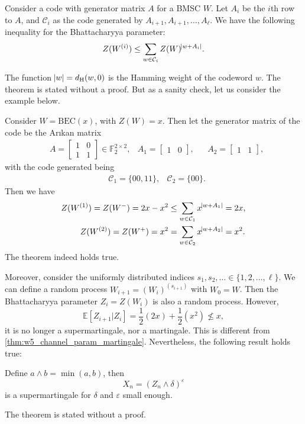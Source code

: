 \begin{theorem}
    Consider a code with generator matrix $A$ for a BMSC $W$. Let $A_i$ be the $i$th row to $A$, and $\mathcal{C}_i$ as the code generated by $A_{i+1},A_{i+1},\ldots,A_\ell$. We have the following inequality for the Bhattacharyya parameter:
    \begin{equation}
        Z(W^{(i)}) \le \sum_{w\in\mathcal{C}_i} Z(W)^{\abs{w+A_i}}.
    \end{equation}
\end{theorem}
The function $\abs{w}=d_\mathrm{H}(w,0)$ is the Hamming weight of the codeword $w$. The theorem is stated without a proof. But as a sanity check, let us consider the example below.
\begin{example}
    Consider $W=\mathrm{BEC}(x)$, with $Z(W) = x$. Then let the generator matrix of the code be the Ar{\i}kan matrix
    \begin{align*}
        &A = \left[\begin{matrix}
            1 & 0 \\ 1 & 1
        \end{matrix}\right]\in\mathbb{F}_2^{2\times2}, & A_1=[\begin{matrix}
            1 & 0
        \end{matrix}], &&A_2 = [\begin{matrix}
            1 & 1
        \end{matrix}],
    \end{align*}
    with the code generated being
    \begin{align*}
        &\mathcal{C}_1 = \{00,11\}, &\mathcal{C}_2 = \{00\}.
    \end{align*}
    Then we have
    \begin{align*}
        Z(W^{(1)}) = Z(W^-) = 2x-x^2 &\le \sum_{w\in\mathcal{C}_1} x^{\abs{w+A_1}} = 2x, \\
        Z(W^{(2)}) = Z(W^+) = x^2 &= \sum_{w\in\mathcal{C}_2} x^{\abs{w+A_2}} = x^2.
    \end{align*}
    The theorem indeed holds true.
\end{example}
Moreover, consider the uniformly distributed indices $s_1,s_2,\ldots\in\{1,2,\ldots,\ell\}$. We can define a random process $W_{i+1}=(W_i)^{(s_{i+1})}$ with $W_0 = W$. Then the Bhattacharyya parameter $Z_i=Z(W_i)$ is also a random process. However,
\begin{equation*}
    \mathbb{E}[Z_{i+1}\vert Z_i] = \frac{1}{2}(2x) + \frac{1}{2}(x^2) \not\le x,
\end{equation*}
it is no longer a supermartingale, nor a martingale. This is different from \autoref{thm:w5_channel_param_martingale}. Nevertheless, the following result holds true:
\begin{theorem}
    Define $a\wedge b = \min(a,b)$, then
    \begin{equation}
        X_n = (Z_n\wedge\delta)^\varepsilon
    \end{equation}
    is a supermartingale for $\delta$ and $\varepsilon$ small enough.
\end{theorem}
The theorem is stated without a proof.



